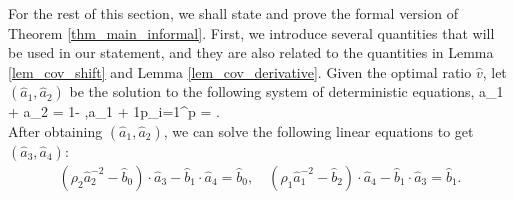 







For the rest of this section, we shall state and prove the formal version of Theorem \ref{thm_main_informal}. %
First, we introduce several quantities that will be used in our statement, and they are also related to the quantities in Lemma \ref{lem_cov_shift} and Lemma \ref{lem_cov_derivative}. Given the optimal ratio $\hat v$, 
let $(\hat a_1, \hat a_2)$ be the solution to the following system of deterministic equations,
	\be
		 \hat a_1 +  \hat a_2 = 1- ,\quad  \hat a_1 + \cdot \frac1p\sum_{i=1}^p  = .\label{eq_a2} \\
		 \ee
		 After obtaining $(\hat a_1,\hat a_2)$, we can solve the following linear equations to get $(\hat a_3,\hat a_4)$:
\begin{gather}
		\left(\rho_2 \hat a_2^{-2}- \hat b_0\right)\cdot \hat  a_3 - \hat b_1 \cdot \hat a_4
		=\hat b_0, \quad \left(\rho_1\hat a_1^{-2} - \hat b_2  \right)\cdot \hat a_4 - \hat b_1 \cdot \hat a_3 =\hat b_1 .\label{eq_a3} 
	\end{gather}
